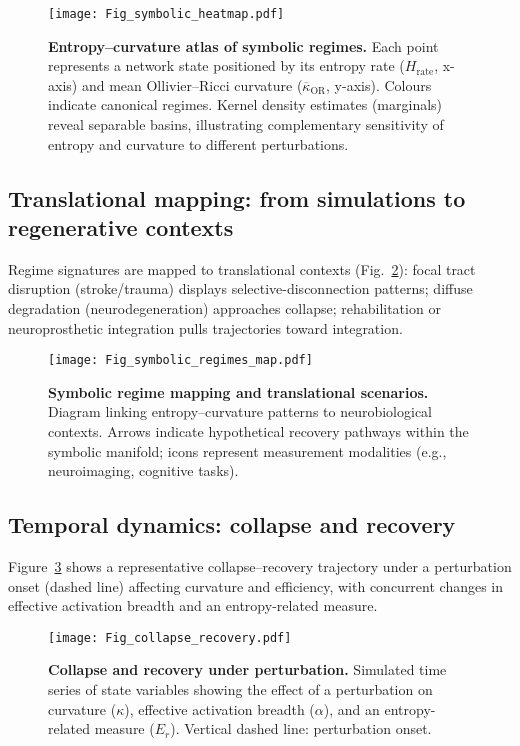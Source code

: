 \documentclass[fleqn,10pt]{wlscirep}
\begin{document}
\begin{figure}[htbp]\centering
\texttt{[image: Fig\_symbolic\_heatmap.pdf]}
\caption{\textbf{Entropy--curvature atlas of symbolic regimes.} Each point represents a network state positioned by its entropy rate ($H_{\mathrm{rate}}$, x-axis) and mean Ollivier--Ricci curvature ($\overline{\kappa}_{\mathrm{OR}}$, y-axis). Colours indicate canonical regimes. Kernel density estimates (marginals) reveal separable basins, illustrating complementary sensitivity of entropy and curvature to different perturbations.}
\label{fig:heatmap}
\end{figure}

\subsection*{Translational mapping: from simulations to regenerative contexts}
Regime signatures are mapped to translational contexts (Fig.~\ref{fig:map}): focal tract disruption (stroke/trauma) displays selective-disconnection patterns; diffuse degradation (neurodegeneration) approaches collapse; rehabilitation or neuroprosthetic integration pulls trajectories toward integration.

\begin{figure}[htbp]\centering
\texttt{[image: Fig\_symbolic\_regimes\_map.pdf]}
\caption{\textbf{Symbolic regime mapping and translational scenarios.} Diagram linking entropy--curvature patterns to neurobiological contexts. Arrows indicate hypothetical recovery pathways within the symbolic manifold; icons represent measurement modalities (e.g., neuroimaging, cognitive tasks).}
\label{fig:map}
\end{figure}

\subsection*{Temporal dynamics: collapse and recovery}
Figure~\ref{fig:collapse} shows a representative collapse--recovery trajectory under a perturbation onset (dashed line) affecting curvature and efficiency, with concurrent changes in effective activation breadth and an entropy-related measure.

\begin{figure}[htbp]\centering
\texttt{[image: Fig\_collapse\_recovery.pdf]}
\caption{\textbf{Collapse and recovery under perturbation.} Simulated time series of state variables showing the effect of a perturbation on curvature ($\kappa$), effective activation breadth ($\alpha$), and an entropy-related measure ($E_r$). Vertical dashed line: perturbation onset.}
\label{fig:collapse}
\end{figure}
\end{document}

